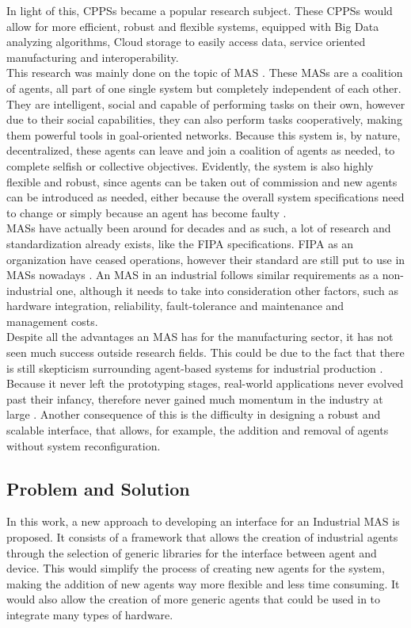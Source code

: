 In light of this, \gls{CPPS}s became a popular research subject. These \gls{CPPS}s would allow for more efficient, robust and flexible systems, equipped with Big Data analyzing algorithms, Cloud storage to easily access data, service oriented manufacturing and interoperability.\\

This research was mainly done on the topic of \gls{MAS} \cite{sakurada01} \cite{karnouskos01}. These \gls{MAS}s are a coalition of agents, all part of one single system but completely independent of each other. They are intelligent, social and capable of performing tasks on their own, however due to their social capabilities, they can also perform tasks cooperatively, making them powerful tools in goal-oriented networks. Because this system is, by nature, decentralized, these agents can leave and join a coalition of agents as needed, to complete selfish or collective objectives. Evidently, the system is also highly flexible and robust, since agents can be taken out of commission and new agents can be introduced as needed, either because the overall system specifications need to change or simply because an agent has become faulty \cite{paulo02}. \\

\gls{MAS}s have actually been around for decades and as such, a lot of research and standardization already exists, like the \gls{FIPA} specifications. \gls{FIPA} as an organization have ceased operations, however their standard are still put to use in \gls{MAS}s nowadays \cite{FIPA_website}. An \gls{MAS} in an industrial follows similar requirements as a non-industrial one, although it needs to take into consideration other factors, such as hardware integration, reliability, fault-tolerance and maintenance and management costs.\\

Despite all the advantages an \gls{MAS} has for the manufacturing sector, it has not seen much success outside research fields. This could be due to the fact that there is still skepticism surrounding agent-based systems for industrial production \cite{bottling_plant_part2}. Because it never left the prototyping stages, real-world applications never evolved past their infancy, therefore never gained much momentum in the industry at large \cite{karnouskos02}. Another consequence of this is the difficulty in designing a robust and scalable interface, that allows, for example, the addition and removal of agents without system reconfiguration. %

\subsection{Problem and Solution}

In this work, a new approach to developing an interface for an Industrial \gls{MAS} is proposed. It consists of a framework that allows the creation of industrial agents through the selection of generic libraries for the interface between agent and device. This would simplify the process of creating new agents for the system, making the addition of new agents way more flexible and less time consuming. It would also allow the creation of more generic agents that could be used in to integrate many types of hardware.